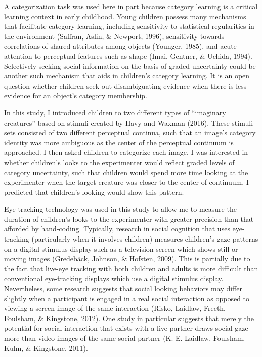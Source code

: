 \documentclass[man]{apa6}
\theoremstyle{definition}
\theoremstyle{definition}
\theoremstyle{definition}
\theoremstyle{remark}
\begin{document}
A categorization task was used here in part because category learning is
a critical learning context in early childhood. Young children possess
many mechanisms that facilitate category learning, including sensitivity
to statistical regularities in the environment (Saffran, Aslin, \&
Newport, 1996), sensitivity towards correlations of shared attributes
among objects (Younger, 1985), and acute attention to perceptual
features such as shape (Imai, Gentner, \& Uchida, 1994). Selectively
seeking social information on the basis of graded uncertainty could be
another such mechanism that aids in children's category learning. It is
an open question whether children seek out disambiguating evidence when
there is less evidence for an object's category membership.

In this study, I introduced children to two different types of
\enquote{imaginary creatures} based on stimuli created by Havy and
Waxman (2016). These stimuli sets consisted of two different perceptual
continua, such that an image's category identity was more ambiguous as
the center of the perceptual continuum is approached. I then asked
children to categorize each image. I was interested in whether
children's looks to the experimenter would reflect graded levels of
category uncertainty, such that children would spend more time looking
at the experimenter when the target creature was closer to the center of
continuum. I predicted that children's looking would show this pattern.

Eye-tracking technology was used in this study to allow me to measure
the duration of children's looks to the experimenter with greater
precision than that afforded by hand-coding. Typically, research in
social cognition that uses eye-tracking (particularly when it involves
children) measures children's gaze patterns on a digital stimulus
display such as a television screen which shows still or moving images
(Gredebäck, Johnson, \& Hofsten, 2009). This is partially due to the
fact that live-eye tracking with both children and adults is more
difficult than conventional eye-tracking displays which use a digital
stimulus display. Nevertheless, some research suggests that social
looking behaviors may differ slightly when a participant is engaged in a
real social interaction as opposed to viewing a screen image of the same
interaction (Risko, Laidlaw, Freeth, Foulsham, \& Kingstone, 2012). One
study in particular suggests that merely the potential for social
interaction that exists with a live partner draws social gaze more than
video images of the same social partner (K. E. Laidlaw, Foulsham, Kuhn,
\& Kingstone, 2011).
\end{document}
